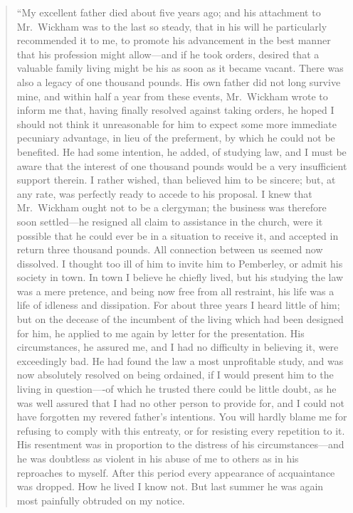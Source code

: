 \documentclass[12pt,english,oneside]{book}
\begin{document}
\begin{quotation}
{}``My excellent father died about five years ago; and his attachment
to Mr.\ Wickham was to the last so steady, that in his will he particularly
recommended it to me, to promote his advancement in the best manner
that his profession might allow\mbox{---}and if he took orders, desired
that a valuable family living might be his as soon as it became vacant.
There was also a legacy of one thousand pounds. His own father did
not long survive mine, and within half a year from these events, Mr.\ Wickham
wrote to inform me that, having finally resolved against taking orders,
he hoped I should not think it unreasonable for him to expect some
more immediate pecuniary advantage, in lieu of the preferment, by
which he could not be benefited. He had some intention, he added,
of studying law, and I must be aware that the interest of one thousand
pounds would be a very insufficient support therein. I rather wished,
than believed him to be sincere; but, at any rate, was perfectly ready
to accede to his proposal. I knew that Mr.\ Wickham ought not to
be a clergyman; the business was therefore soon settled\mbox{---}he
resigned all claim to assistance in the church, were it possible that
he could ever be in a situation to receive it, and accepted in return
three thousand pounds. All connection between us seemed now dissolved.
I thought too ill of him to invite him to Pemberley, or admit his
society in town. In town I believe he chiefly lived, but his studying
the law was a mere pretence, and being now free from all restraint,
his life was a life of idleness and dissipation. For about three years
I heard little of him; but on the decease of the incumbent of the
living which had been designed for him, he applied to me again by
letter for the presentation. His circumstances, he assured me, and
I had no difficulty in believing it, were exceedingly bad. He had
found the law a most unprofitable study, and was now absolutely resolved
on being ordained, if I would present him to the living in question\mbox{---}-of
which he trusted there could be little doubt, as he was well assured
that I had no other person to provide for, and I could not have forgotten
my revered father's intentions. You will hardly blame me for refusing
to comply with this entreaty, or for resisting every repetition to
it. His resentment was in proportion to the distress of his circumstances\mbox{---}and
he was doubtless as violent in his abuse of me to others as in his
reproaches to myself. After this period every appearance of acquaintance
was dropped. How he lived I know not. But last summer he was again
most painfully obtruded on my notice.


\end{quotation}
\end{document}
